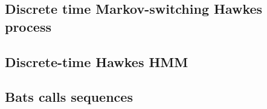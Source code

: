 \subsection*{Discrete time Markov-switching Hawkes process} 

\subsection{Discrete-time Hawkes HMM} 

\subsection{Bats calls sequences}

